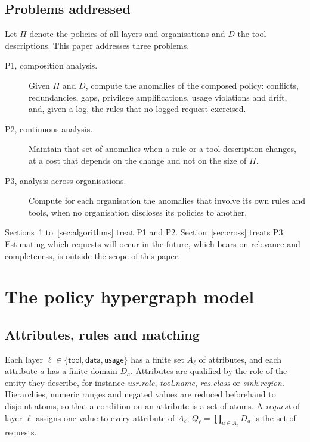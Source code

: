 \documentclass[preprint,12pt]{elsarticle}
\theoremstyle{definition}
\theoremstyle{remark}
\begin{document}
\subsection{Problems addressed}
Let $\Pi$ denote the policies of all layers and organisations and $D$ the tool descriptions. This paper addresses three problems.
\begin{description}
\item[P1, composition analysis.] Given $\Pi$ and $D$, compute the anomalies of the composed policy: conflicts, redundancies, gaps, privilege amplifications, usage violations and drift, and, given a log, the rules that no logged request exercised.
\item[P2, continuous analysis.] Maintain that set of anomalies when a rule or a tool description changes, at a cost that depends on the change and not on the size of $\Pi$.
\item[P3, analysis across organisations.] Compute for each organisation the anomalies that involve its own rules and tools, when no organisation discloses its policies to another.
\end{description}
Sections~\ref{sec:model} to~\ref{sec:algorithms} treat P1 and P2. Section~\ref{sec:cross} treats P3. Estimating which requests will occur in the future, which bears on relevance and completeness, is outside the scope of this paper.

\section{The policy hypergraph model}\label{sec:model}

\subsection{Attributes, rules and matching}
Each layer $\ell \in \{\mathsf{tool}, \mathsf{data}, \mathsf{usage}\}$ has a finite set $A_\ell$ of attributes, and each attribute $a$ has a finite domain $D_a$. Attributes are qualified by the role of the entity they describe, for instance \textit{usr.role}, \textit{tool.name}, \textit{res.class} or \textit{sink.region}. Hierarchies, numeric ranges and negated values are reduced beforehand to disjoint atoms, so that a condition on an attribute is a set of atoms. A \emph{request} of layer $\ell$ assigns one value to every attribute of $A_\ell$; $Q_\ell = \prod_{a \in A_\ell} D_a$ is the set of requests.
\end{document}
